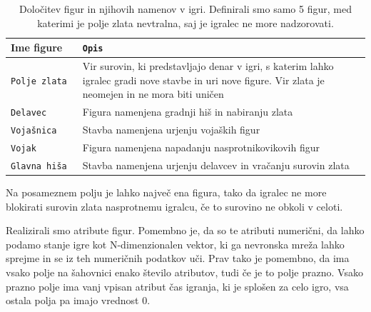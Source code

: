 \documentclass[a4paper, 12pt]{book}
\begin{document}
\begin{table}
	\begin{center}
		\begin{tabular}{p{0.2\linewidth}|p{0.8\linewidth}}
			Ime figure        & {\tt Opis} \\ \hline
			{\tt Polje zlata} & Vir surovin, ki predstavljajo denar v igri, s katerim lahko igralec gradi nove stavbe in uri nove figure. 
								Vir zlata je neomejen in ne mora biti uničen \\
			{\tt Delavec}     & Figura namenjena gradnji hiš in nabiranju zlata \\
			{\tt Vojašnica}   & Stavba namenjena urjenju vojaških figur \\
			{\tt Vojak}       & Figura namenjena napadanju nasprotnikovikovih figur \\
			{\tt Glavna hiša} & Stavba namenjena urjenju delavcev in vračanju surovin zlata \\
		\end{tabular}
	\end{center}
	\caption{Določitev figur in njihovih namenov v igri. Definirali smo samo 5 figur, med katerimi je polje zlata nevtralna, saj je igralec ne more nadzorovati. }
	\label{tableFiguresDescription}
\end{table}

Na posameznem polju je lahko največ ena figura, tako da igralec ne more blokirati surovin zlata nasprotnemu igralcu, če to surovino ne obkoli v celoti.

Realizirali smo atribute figur. 
Pomembno je, da so te atributi numerični, da lahko podamo stanje igre kot N-dimenzionalen vektor, ki ga nevronska mreža lahko sprejme in se iz teh numeričnih podatkov uči.
Prav tako je pomembno, da ima vsako polje na šahovnici enako število atributov, tudi če je to polje prazno.
Vsako prazno polje ima vanj vpisan atribut čas igranja, ki je splošen za celo igro, vsa ostala polja pa imajo vrednost 0.
\end{document}
